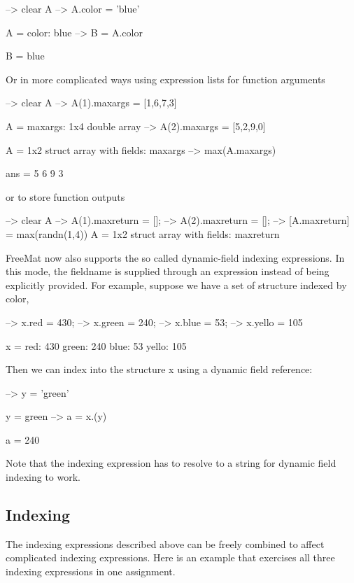 \begin{DoxyVerbInclude}
--> clear A
--> A.color = 'blue'

A = 
    color: blue
--> B = A.color

B = 
blue
\end{DoxyVerbInclude}


Or in more complicated ways using expression lists for function arguments


\begin{DoxyVerbInclude}
--> clear A
--> A(1).maxargs = [1,6,7,3]

A = 
    maxargs: 1x4 double array
--> A(2).maxargs = [5,2,9,0]

A = 
1x2 struct array with fields:
    maxargs
--> max(A.maxargs)

ans = 
 5 6 9 3 
\end{DoxyVerbInclude}


or to store function outputs


\begin{DoxyVerbInclude}
--> clear A
--> A(1).maxreturn = [];
--> A(2).maxreturn = [];
--> [A.maxreturn] = max(randn(1,4))
A = 
1x2 struct array with fields:
    maxreturn
\end{DoxyVerbInclude}


Free\-Mat now also supports the so called dynamic-\/field indexing expressions. In this mode, the fieldname is supplied through an expression instead of being explicitly provided. For example, suppose we have a set of structure indexed by color,


\begin{DoxyVerbInclude}
--> x.red = 430;
--> x.green = 240;
--> x.blue = 53;
--> x.yello = 105

x = 
    red: 430
    green: 240
    blue: 53
    yello: 105
\end{DoxyVerbInclude}


Then we can index into the structure {\ttfamily x} using a dynamic field reference\-:


\begin{DoxyVerbInclude}
--> y = 'green'

y = 
green
--> a = x.(y)

a = 
 240 
\end{DoxyVerbInclude}


Note that the indexing expression has to resolve to a string for dynamic field indexing to work. \hypertarget{variables_indexing_Complex}{}\subsection{Indexing}\label{variables_indexing_Complex}
The indexing expressions described above can be freely combined to affect complicated indexing expressions. Here is an example that exercises all three indexing expressions in one assignment.


